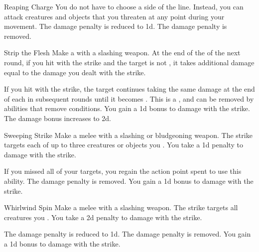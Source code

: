 {\begin{ability}{Reaping Charge}
                \rankline
                 You do not have to choose a side of the line.
                Instead, you can attack creatures and objects that you threaten at any point during your movement.
                 The damage penalty is reduced to \minus1d.
                 The damage penalty is removed.
            \end{ability}

            \begin{ability}{Strip the Flesh}
                Make a  with a slashing weapon.
                At the end of the  of the next round, if you hit with the strike and the target is not , it takes additional damage equal to the damage you dealt with the strike.

                \rankline
                 If you hit with the strike, the target continues taking the same damage at the end of each  in subsequent rounds until it becomes .
                This is a , and can be removed by abilities that remove conditions.
                 You gain a \plus1d bonus to damage with the strike.
                 The damage bonus increases to \plus2d.
            \end{ability}

            \begin{ability}{Sweeping Strike}
                Make a melee  with a slashing or bludgeoning weapon.
                The strike targets each of up to three creatures or objects you .
                You take a \minus1d penalty to damage with the strike.

                \rankline
                 If you missed all of your targets, you regain the action point spent to use this ability.
                 The damage penalty is removed.
                 You gain a \plus1d bonus to damage with the strike.
            \end{ability}

            \begin{ability}{Whirlwind Spin}
                Make a melee  with a slashing weapon.
                The strike targets all creatures you .
                You take a \minus2d penalty to damage with the strike.

                \rankline
                 The damage penalty is reduced to \minus1d.
                 The damage penalty is removed.
                 You gain a \plus1d bonus to damage with the strike.
            \end{ability}
        }

